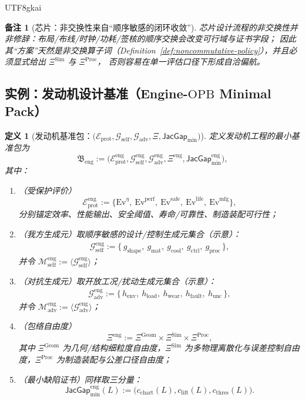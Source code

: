 \documentclass[12pt]{article}
\newtheorem{definition}{定义}[section]
\newtheorem{remark}{备注}[section]
\newcommand{\JacGap}{\ensuremath{\mathsf{JacGap}}}
\newcommand{\OPB}{\ensuremath{\mathrm{OPB}}}
\begin{document}
\begin{CJK*}{UTF8}{gkai}
\begin{remark}[芯片：非交换性来自“顺序敏感的闭环收敛”]
芯片设计流程的非交换性并非修辞：布局/布线/时钟/功耗/签核的顺序交换会改变可行域与证书字段；
因此其“方案”天然是非交换算子词（Definition~\ref{def:noncommutative-policy}），并且必须显式给出 $\Xi^{\mathrm{Sim}}$ 与 $\Xi^{\mathrm{Proc}}$，
  否则容易在单一评估口径下形成自洽偏航。
\end{remark}

\subsection{实例：发动机设计基准（Engine-\OPB{} Minimal Pack）}

\begin{definition}[发动机基准包：$\bigl(\mathcal{E}_{\mathrm{prot}},\mathcal{G}_{\mathrm{self}},\mathcal{G}_{\mathrm{adv}},\Xi,
  \JacGap_{\min}\bigr)$]
\label{def:engine-opb-minimal-pack}
定义发动机工程的最小基准包为
\[
\mathfrak{B}_{\mathrm{eng}}
:=
\bigl(
  \mathcal{E}_{\mathrm{prot}}^{\mathrm{eng}},
  \mathcal{G}_{\mathrm{self}}^{\mathrm{eng}},
  \mathcal{G}_{\mathrm{adv}}^{\mathrm{eng}},
  \Xi^{\mathrm{eng}},
  \JacGap_{\min}^{\mathrm{eng}}
\bigr),
\]
其中：
\begin{enumerate}
  \item（受保护评价）
  \[
  \mathcal{E}_{\mathrm{prot}}^{\mathrm{eng}}
  :=
  \bigl\{
    \mathrm{Ev}^{\eta},\ \mathrm{Ev}^{\mathrm{perf}},\ \mathrm{Ev}^{\mathrm{safe}},\ \mathrm{Ev}^{\mathrm{life}},\
      \mathrm{Ev}^{\mathrm{mfg}}
  \bigr\},
  \]
  分别锚定效率、性能输出、安全阈值、寿命/可靠性、制造装配可行性；
  \item（我方生成元）取顺序敏感的设计/控制生成元集合（示意）：
  \[
  \begin{aligned}
  \mathcal{G}_{\mathrm{self}}^{\mathrm{eng}}
  :=
  \{\, g_{\mathrm{shape}},\ g_{\mathrm{mat}},\ g_{\mathrm{cool}},\ g_{\mathrm{ctrl}},\ g_{\mathrm{proc}}\,\},
  \end{aligned}
  \]
  并令 $\mathcal{M}_{\mathrm{self}}^{\mathrm{eng}}:=\langle \mathcal{G}_{\mathrm{self}}^{\mathrm{eng}}\rangle$；
  \item（对抗生成元）取开放工况/扰动生成元集合（示意）：
  \[
  \begin{aligned}
  \mathcal{G}_{\mathrm{adv}}^{\mathrm{eng}}
  :=
  \{\, h_{\mathrm{env}},\ h_{\mathrm{load}},\ h_{\mathrm{wear}},\ h_{\mathrm{fault}},\ h_{\mathrm{unc}}\,\},
  \end{aligned}
  \]
  并令 $\mathcal{M}_{\mathrm{adv}}^{\mathrm{eng}}:=\langle \mathcal{G}_{\mathrm{adv}}^{\mathrm{eng}}\rangle$；
  \item（包络自由度）
  \[
  \Xi^{\mathrm{eng}}:=\Xi^{\mathrm{Geom}}\times \Xi^{\mathrm{Sim}}\times \Xi^{\mathrm{Proc}},
  \]
  其中 $\Xi^{\mathrm{Geom}}$ 为几何/结构细粒度自由度，$\Xi^{\mathrm{Sim}}$ 为多物理离散化与误差控制自由度，$\Xi^{\mathrm{Proc}}$ 为制造装配与公差口径自由度；
  \item（最小缺陷证书）同样取三分量：
  \[
  \JacGap_{\min}^{\mathrm{eng}}(L)
  :=
  \bigl(c_{\mathrm{chart}}(L),c_{\mathrm{lift}}(L),c_{\mathrm{thres}}(L)\bigr).
  \]
\end{enumerate}
\end{definition}


\end{CJK*}
\end{document}
